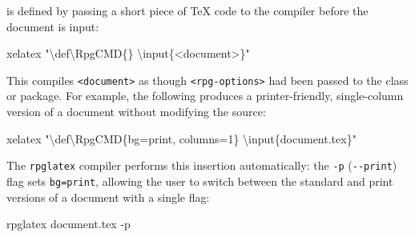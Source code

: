 		 is defined by passing a short piece of \TeX{} code to the compiler before the document is input:
		\begin{Code}
			xelatex "\textbackslash{}def\textbackslash{}RpgCMD\{<rpg-options>\} \textbackslash{}input\{<document>\}"
		\end{Code}
		This compiles \texttt{<document>} as though \texttt{<rpg-options>} had been passed to the class or package. For example, the following produces a printer-friendly, single-column version of a document without modifying the source:
		\begin{Code}
			xelatex "\textbackslash{}def\textbackslash{}RpgCMD\{bg=print, columns=1\} \textbackslash{}input\{document.tex\}"
		\end{Code}

		The \texttt{rpglatex} compiler  performs this insertion automatically: the \texttt{-p} (\texttt{-{}-print}) flag sets \texttt{bg=print}, allowing the user to switch between the standard and print versions of a document with a single flag:
		\begin{Code}
			rpglatex document.tex -p
		\end{Code}
